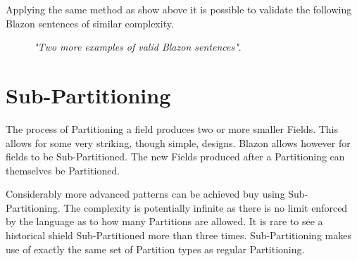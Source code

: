 Applying the same method as show above it is possible to validate the following Blazon sentences of similar complexity. 

\begin{figure}[H]
\hfill
{}
\hfill

\caption{\emph{"Two more examples of valid Blazon sentences"}.}
\end{figure}



\section{Sub-Partitioning}

The process of Partitioning a field produces two or more smaller Fields.  This allows for some very striking, though simple, designs.  Blazon allows however for fields to be Sub-Partitioned.  The new Fields produced after a Partitioning can themselves be Partitioned. 

Considerably more advanced patterns can be achieved buy using Sub-Partitioning.  The complexity is potentially infinite as there is no limit enforced by the language as to how many Partitions are allowed.  It is rare to see a historical shield Sub-Partitioned more than three times.  Sub-Partitioning makes use of exactly the same set of Partition types as regular Partitioning.  

